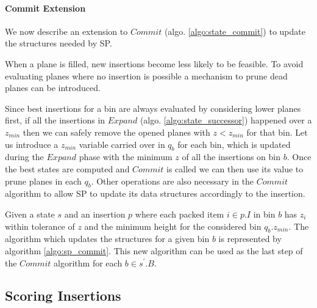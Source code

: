 

\paragraph*{Commit Extension}
We now describe an extension to $Commit$ (algo. \ref{algo:state_commit}) to update the structures needed by SP.

When a plane is filled, new insertions become less likely to be feasible. 
To avoid evaluating planes where no insertion is possible a mechanism to prune dead planes can be introduced.

Since best insertions for a bin are always evaluated by considering lower planes first, if all the insertions in $Expand$ (algo. \ref{algo:state_successor}) happened over a $z_{min}$ then we can safely remove the opened planes with $z < z_{min}$ for that bin.
Let us introduce a $z_{min}$ variable carried over in $q_b$ for each bin, which is updated during the $Expand$ phase with the minimum $z$ of all the insertions on bin $b$.
Once the best states are computed and $Commit$ is called we can then use its value to prune planes in each $q_b$.
Other operations are also necessary in the $Commit$ algorithm to allow SP to update its data structures accordingly to the insertion.

Given a state $s$ and an insertion $p$ where each packed item $i \in p.I$ in bin $b$ has $z_i$ within tolerance of $z$ and the minimum height for the considered bin $q_b.z_{min}$.
The algorithm which updates the structures for a given bin $b$ is represented by algorithm \ref{algo:sp_commit}.
This new algorithm can be used as the last step of the $Commit$ algorithm for each $b \in s^\prime.B$.



\subsection{Scoring Insertions}
\label{ssec:scoring_insertions}%